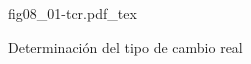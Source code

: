 \begin{figure}[h]
\centering
\def\svgwidth{0.5\textwidth}
{fig08_01-tcr.pdf_tex}
\caption{Determinación del tipo de cambio real}
\label{fig08_01-tcr}
\end{figure}